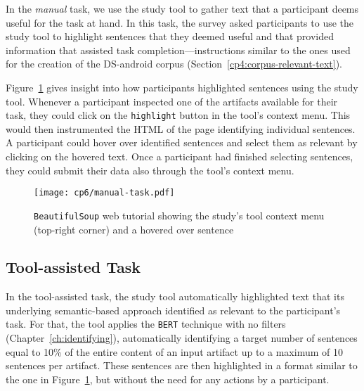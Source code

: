 In the \textit{manual} task, we use the study tool to gather text that a participant deems useful for the task at hand. In this task, 
the survey asked participants to use the study tool to highlight sentences that they deemed useful and that provided information that assisted task completion---instructions similar to the ones used for the creation of the \acs{DS-android} corpus (Section~\ref{cp4:corpus-relevant-text}).



Figure~\ref{fig:artifact-pre-highlight}
gives insight into how participants highlighted sentences using the study tool. 
Whenever a participant inspected one of the artifacts available for their task, 
they could click on the \texttt{highlight} button in the tool's context menu.  
This would then instrumented the HTML of the page identifying individual sentences. 
A participant could hover over identified sentences and select them as relevant by clicking on the hovered text.
Once a participant had finished selecting sentences, they could submit 
their data also through the tool's context menu.





\begin{figure}
    \centering
    \texttt{[image: cp6/manual-task.pdf]}
    \caption{\texttt{BeautifulSoup} web tutorial showing the study's tool context menu (top-right corner) and a hovered over sentence}
    \label{fig:artifact-pre-highlight}
\end{figure}




\subsection{Tool-assisted Task}
\label{cp6:procedures-tool-assisted}


In the tool-assisted task, the study tool automatically highlighted text that 
its underlying semantic-based approach identified as relevant to the participant's task.
For that, the tool applies the \texttt{BERT} technique with no filters (Chapter~\ref{ch:identifying}),
automatically identifying a target number of sentences equal to 10\% of the entire content of an input artifact up to a maximum of 10 sentences per artifact.
These sentences are then highlighted in a format similar to the one in Figure~\ref{fig:artifact-pre-highlight}, but without the need for any actions by a participant.





